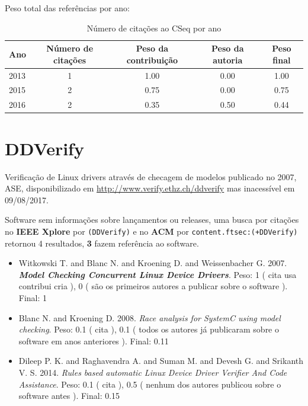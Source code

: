 Peso total das referências por ano:

\begin{table}[h]
\caption{Número de citações ao CSeq por ano}
\centering
\begin{tabular}{| l | c | c | c | c |}
  \hline
  Ano & Número de citações & Peso da contribuição & Peso da autoria & Peso final \\
  \hline
  2013
    & 1
    & 1.00
    & 0.00
    & 1.00 \\
  2015
    & 2
    & 0.75
    & 0.00
    & 0.75 \\
  2016
    & 2
    & 0.35
    & 0.50
    & 0.44 \\
  \hline
\end{tabular}
\end{table}


\section{DDVerify}

Verificação de Linux drivers através de checagem de modelos
publicado no 2007, ASE,
disponibilizado em \url{http://www.verify.ethz.ch/ddverify}
mas inacessível em 09/08/2017.

Software sem informações sobre lançamentos ou releases,
uma busca por citações no {\bf IEEE Xplore} por
\texttt{(DDVerify)}
e no {\bf ACM} por
\texttt{content.ftsec:(+DDVerify)}
retornou
4 resultados,
{\bf 3} fazem referência ao software.

\begin{itemize}
\item Witkowski T. and Blanc N. and Kroening D. and Weissenbacher G.
      2007.
        \textbf{\textit{ Model Checking Concurrent Linux Device Drivers}}.
      Peso:
      1 (
          cita
          usa
          contribui
          cria
      ),
      0 (
são os primeiros autores a publicar sobre o software
      ).
      Final:
      1

\item Blanc N. and Kroening D.
      2008.
        \textit{ Race analysis for SystemC using model checking}.
      Peso:
      0.1 (
          cita
      ),
      0.1 (
todos os autores já publicaram sobre o software em anos anteriores
      ).
      Final:
      0.11

\item Dileep P. K. and Raghavendra A. and Suman M. and Devesh G. and Srikanth V. S.
      2014.
        \textit{ Rules based automatic Linux Device Driver Verifier And Code Assistance}.
      Peso:
      0.1 (
          cita
      ),
      0.5 (
nenhum dos autores publicou sobre o software antes
      ).
      Final:
      0.15

\end{itemize}

